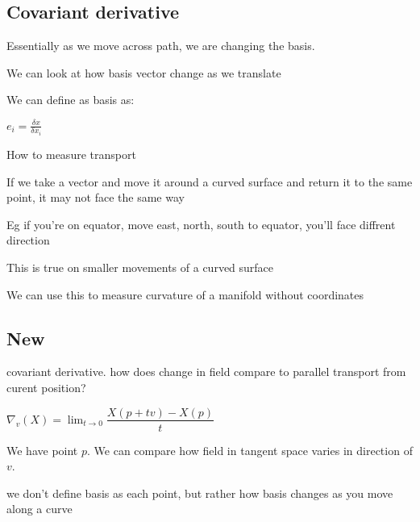 
\subsection{Covariant derivative}

Essentially as we move across path, we are changing the basis.

We can look at how basis vector change as we translate

We can define as basis as:

\(e_i=\frac{\delta x}{\delta x_i}\)

How to measure transport

If we take a vector and move it around a curved surface and return it to the same point, it may not face the same way

Eg if you're on equator, move east, north, south to equator, you'll face diffrent direction

This is true on smaller movements of a curved surface

We can use this to measure curvature of a manifold without coordinates 

\subsection{New}

covariant derivative. how does change in field compare to parallel transport from curent position?

\(\nabla_v (X)=\lim_{t\rightarrow 0}\dfrac{X(p+tv)-X(p)}{t}\)

We have point \(p\). We can compare how field in tangent space varies in direction of \(v\).

we don't define basis as each point, but rather how basis changes as you move along a curve


